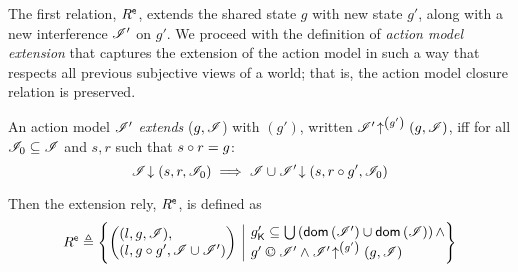 The first relation, $R^{\textsf{e}}$, extends the shared state $g$ with new state $g'$, along with a new interference $\mathscr{I}'$ on $g'$. We proceed with the definition of \emph{action model extension} that captures the extension of the action model in such a way that respects all previous subjective views of a world; that is, the action model closure relation is preserved.
%
%
\begin{definition}\label{def:amodExtension}
An action model $\mathscr{I}'$ \emph{extends} ($g, \mathscr{I}$) with
$(g')$, written
$\mathscr{I}' \!\uparrow^{\left(g'\right)} \left(g, \mathscr{I}\right)$, iff for all
$\mathscr{I}_0 \subseteq \mathscr{I}$ and $s, r$ such that $s \circ r = g$:
\[
\mathscr{I} \!\downarrow \left(s, r, \mathscr{I}_0\right) \implies \mathscr{I} \cup \mathscr{I}' \!\downarrow \left(s, r\circ g', \mathscr{I}_0\right)
\]
\end{definition}
%
%
Then the extension rely, $R^{\textsf{e}}$, is defined as
%
\[
  \extendR \eqdef
  \left\{
  \begin{array}{@{} l @{\hspace{5pt}} | @{\hspace{5pt}} l @{}}
    \left(
    \begin{array}{@{} l @{}}
      (l , g, \lmod),\\
      (l, g \composeL g', \lmod \cup \lmod')
    \end{array}
    \right)
    &
    \begin{array}{@{} l @{}}
      \capPart{g'} \containedIn \bigcup\left(\dom{\lmod'} \cup \dom{\lmod} \right)\land \\
      	g' \containI \lmod' \land
      \expandsAM{\lmod'}{g'}{g}{\lmod}
    \end{array}
  \end{array}
  \right\}
\]


